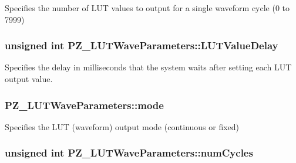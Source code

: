 Specifies the number of L\+UT values to output for a single waveform cycle (0 to 7999) 

\subsubsection[{\texorpdfstring{L\+U\+T\+Value\+Delay}{LUTValueDelay}}]{\setlength{\rightskip}{0pt plus 5cm}unsigned int P\+Z\+\_\+\+L\+U\+T\+Wave\+Parameters\+::\+L\+U\+T\+Value\+Delay}\hypertarget{struct_p_z___l_u_t_wave_parameters_aaccf1dba9b7ef35ae9af9305d032500e}{}\label{struct_p_z___l_u_t_wave_parameters_aaccf1dba9b7ef35ae9af9305d032500e}


Specifies the delay in milliseconds that the system waits after setting each L\+UT output value. 

\subsubsection[{\texorpdfstring{mode}{mode}}]{ P\+Z\+\_\+\+L\+U\+T\+Wave\+Parameters\+::mode}\hypertarget{struct_p_z___l_u_t_wave_parameters_a7727bf94a2c4de7acd16d68eb8325cd3}{}\label{struct_p_z___l_u_t_wave_parameters_a7727bf94a2c4de7acd16d68eb8325cd3}


Specifies the L\+UT (waveform) output mode (continuous or fixed) 

\subsubsection[{\texorpdfstring{num\+Cycles}{numCycles}}]{\setlength{\rightskip}{0pt plus 5cm}unsigned int P\+Z\+\_\+\+L\+U\+T\+Wave\+Parameters\+::num\+Cycles}\hypertarget{struct_p_z___l_u_t_wave_parameters_af0473f741904642e45bb31c47729ae07}{}\label{struct_p_z___l_u_t_wave_parameters_af0473f741904642e45bb31c47729ae07}


